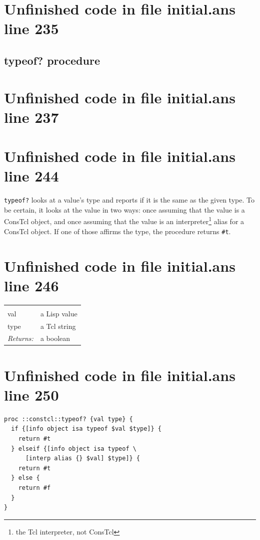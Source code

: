 \documentclass[twoside,9pt]{report}
\begin{document}
\section{Unfinished code in file initial.ans line 235}
\subsection{typeof? procedure}
\label{typeof?-procedure}
\section{Unfinished code in file initial.ans line 237}

\section{Unfinished code in file initial.ans line 244}

\texttt{typeof?} looks at a value's type and reports if it is the same as the given type. To be certain, it looks at the value in two ways: once assuming that the value is a ConsTcl object, and once assuming that the value is an interpreter\footnote{the Tcl interpreter, not ConsTcl} alias for a ConsTcl object. If one of those affirms the type, the procedure returns \texttt{\#t}.

\section{Unfinished code in file initial.ans line 246}
\noindent\begin{tabular}{ |p{1.9cm} p{8cm}| }
\hline
\rowcolor[HTML]{CCCCCC} \multicolumn{2}{|l|}{\bf typeof? (internal)} \\
val & a Lisp value \\
type & a Tcl string \\
\textit{Returns:} & a boolean \\
\hline
\end{tabular}
\section{Unfinished code in file initial.ans line 250}
\begin{lstlisting}
proc ::constcl::typeof? {val type} {
  if {[info object isa typeof $val $type]} {
    return #t
  } elseif {[info object isa typeof \
      [interp alias {} $val] $type]} {
    return #t
  } else {
    return #f
  }
}
\end{lstlisting}
\end{document}
